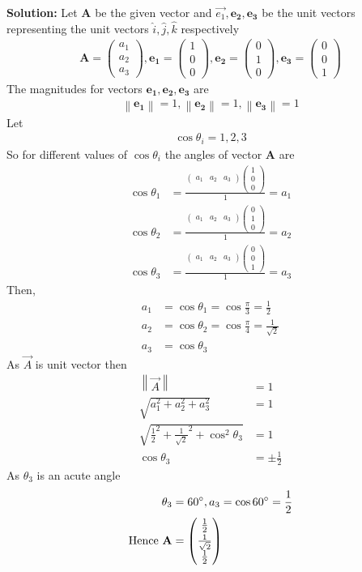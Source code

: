 \documentclass[12pt]{article}
\providecommand{\norm}[1]{\left\lVert#1\right\rVert}
\newcommand{\solution}{\noindent \textbf{Solution: }}
\newcommand{\myvec}[1]{\ensuremath{\begin{pmatrix}#1\end{pmatrix}}}
\let\vec\mathbf
\begin{document}
\begin{enumerate}
\solution 
Let $\vec{A}$ be the given vector and $\Vec{e_1},\vec{e_2},\vec{e_3}$ be the unit vectors representing the unit vectors $\hat{i},\hat{j},\hat{k}$ respectively
\begin{align}
 \vec{A} =\myvec{a_1\\a_2\\a_3},\vec{e_1} =\myvec{1\\0\\0},\vec{e_2}=\myvec{0\\1\\0},\vec{e_3} =\myvec{0\\0\\1}
\end{align}
  The magnitudes for vectors $\vec{e_1},\vec{e_2},\vec{e_3}$ are
 \begin{align}
\norm{\vec{e_1}}=1,\norm{\vec{e_2}}=1,\norm{\vec{e_3}}=1
 \end{align}
Let 
\begin{align}
 \cos\theta_i=1,2,3  
\end{align}
  So for different values of $\cos\theta_i$ the angles of vector $\vec{A}$ are
\begin{align}
 \cos\theta_1 &=\frac{\myvec{a_1&a_2&a_3}\myvec{1\\0\\0}}{1}=a_1\\
 \cos\theta_2 &=\frac{\myvec{a_1&a_2&a_3}\myvec{0\\1\\0}}{1}=a_2\\
 \cos\theta_3 &=\frac{\myvec{a_1&a_2&a_3}\myvec{0\\0\\1}}{1}=a_3
\end{align}
Then,
\begin{align}
     a_1 &=\cos\theta_1 =\cos\frac{\pi}{3}=\frac{1}{2}\\ a_2 &=\cos\theta_2 =\cos\frac{\pi}{4}=\frac{1}{\sqrt{2}}\\
     a_3 &=\cos\theta_3 
\end{align}
As $\Vec{A}$ is unit vector then
\begin{align}
    \norm{\Vec{A}}&=1\\
    \sqrt{a_1^2+a_2^2+a_3^2}&=1\\
    \sqrt{\frac{1}{2}^2+\frac{1}{\sqrt{2}}^2+\cos^2\theta_3 }&=1\\
    \cos\theta_3 &=\pm\frac{1}{2}
\end{align}
As $\theta_3$ is an acute angle
\begin{align}
    \theta_3&=60\degree, a_3=\cos60\degree=\frac{1}{2}\\
    \text{Hence }\vec{A}&=\myvec{\frac{1}{2}\\[2pt] \frac{1}{\sqrt{2}}\\[2pt] \frac{1}{2}}
\end{align}
\end{enumerate}
\end{document}
